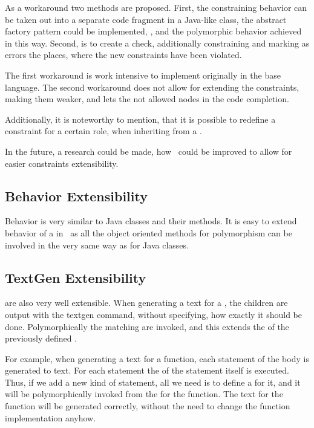 As a workaround two methods are proposed. First, the constraining behavior can be taken out into a separate code fragment in a Java-like class,
the abstract factory pattern could be implemented, \cite{GOF95}, and the polymorphic behavior achieved in this way.  Second, is to 
create a check, additionally constraining and marking as errors the places, where the new constraints have been violated.

The first workaround is work intensive to implement originally in the base language. The second workaround does not allow for extending the 
constraints, making them weaker, and lets the not allowed nodes in the code completion.


Additionally, it is noteworthy to mention, that it is possible to redefine a constraint for a certain role, when inheriting 
from a .

In the future, a research could be made, how \jbmps\ could be improved to allow for easier constraints extensibility.

\subsection{Behavior Extensibility}

Behavior is very similar to Java classes and their methods. It is easy to extend behavior of a  in \jbmps\
as all the object oriented methods for polymorphism can be involved in the very same way as for Java classes.

\subsection{TextGen Extensibility}

 are also very well extensible. When generating a text for a , the children are output with 
the textgen \mpsid{append} command, without specifying, how exactly it should be done. Polymorphically the 
matching \rgp{textgen} are invoked, and this extends the \rg{textgen} of the previously defined \rg{concept}.

For example, when generating a text for a function, each statement of the body is generated to text. 
For each statement the  of the statement itself is executed. Thus, if we add a new kind of statement,
all we need is to define a  for it, and it will be polymorphically invoked from the  for the
function. The text for the function will be generated correctly, without the need to change the function \rg{textgen}
implementation anyhow.

